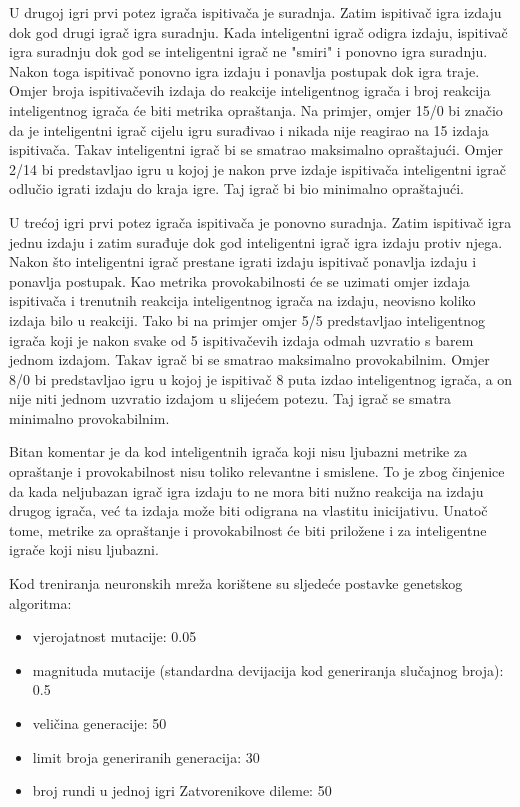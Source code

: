 \documentclass[zavrsnirad]{fer}
\begin{document}
	U drugoj igri prvi potez igrača ispitivača je suradnja. Zatim ispitivač igra izdaju dok god drugi igrač igra suradnju. Kada inteligentni igrač odigra izdaju, ispitivač igra suradnju dok god se inteligentni igrač ne "smiri" i ponovno igra suradnju. Nakon toga ispitivač ponovno igra izdaju i ponavlja postupak dok igra traje. Omjer broja ispitivačevih izdaja do reakcije inteligentnog igrača i broj reakcija inteligentnog igrača će biti metrika opraštanja. Na primjer, omjer 15/0 bi značio da je inteligentni igrač cijelu igru surađivao i nikada nije reagirao na 15 izdaja ispitivača. Takav inteligentni igrač bi se smatrao maksimalno opraštajući. Omjer 2/14 bi predstavljao igru u kojoj je nakon prve izdaje ispitivača inteligentni igrač odlučio igrati izdaju do kraja igre. Taj igrač bi bio minimalno opraštajući.
	
	U trećoj igri prvi potez igrača ispitivača je ponovno suradnja. Zatim ispitivač igra jednu izdaju i zatim surađuje dok god inteligentni igrač igra izdaju protiv njega. Nakon što inteligentni igrač prestane igrati izdaju ispitivač ponavlja izdaju i ponavlja postupak. Kao metrika provokabilnosti će se uzimati omjer izdaja ispitivača i trenutnih reakcija inteligentnog igrača na izdaju, neovisno koliko izdaja bilo u reakciji. Tako bi na primjer omjer 5/5 predstavljao inteligentnog igrača koji je nakon svake od 5 ispitivačevih izdaja odmah uzvratio s barem jednom izdajom. Takav igrač bi se smatrao maksimalno provokabilnim. Omjer 8/0 bi predstavljao igru u kojoj je ispitivač 8 puta izdao inteligentnog igrača, a on nije niti jednom uzvratio izdajom u slijećem potezu. Taj igrač se smatra minimalno provokabilnim.
	
	Bitan komentar je da kod inteligentnih igrača koji nisu ljubazni metrike za opraštanje i provokabilnost nisu toliko relevantne i smislene. To je zbog činjenice da kada neljubazan igrač igra izdaju to ne mora biti nužno reakcija na izdaju drugog igrača, već ta izdaja može biti odigrana na vlastitu inicijativu. Unatoč tome, metrike za opraštanje i provokabilnost će biti priložene i za inteligentne igrače koji nisu ljubazni.
	
	Kod treniranja neuronskih mreža korištene su sljedeće postavke genetskog algoritma:
	\begin{itemize}
		\item vjerojatnost mutacije: 0.05
		\item magnituda mutacije (standardna devijacija kod generiranja slučajnog broja): 0.5
		\item veličina generacije: 50
		\item limit broja generiranih generacija: 30
		\item broj rundi u jednoj igri Zatvorenikove dileme: 50
	\end{itemize}
\end{document}
